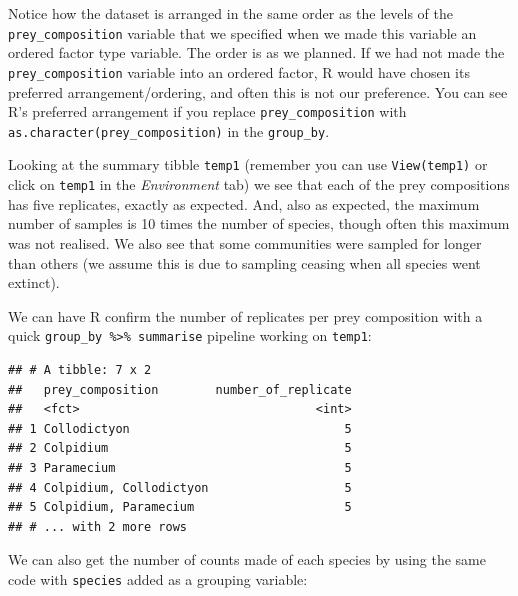 \documentclass[]{book}
\makeatletter
\newenvironment{Shaded}{\begin{snugshade}}{\end{snugshade}}
\newcommand{\DataTypeTok}[1]{\textcolor[rgb]{0.13,0.29,0.53}{#1}}
\newcommand{\KeywordTok}[1]{\textcolor[rgb]{0.13,0.29,0.53}{\textbf{#1}}}
\newcommand{\NormalTok}[1]{#1}
\newcommand{\OperatorTok}[1]{\textcolor[rgb]{0.81,0.36,0.00}{\textbf{#1}}}
\newcommand{\StringTok}[1]{\textcolor[rgb]{0.31,0.60,0.02}{#1}}
\newenvironment{kframe}{%
\medskip{}
\setlength{\fboxsep}{.8em}
 \def\at@end@of@kframe{}%
 \ifinner\ifhmode%
  \def\at@end@of@kframe{\end{minipage}}%
  \begin{minipage}{\columnwidth}%
 \fi\fi%
 \def\FrameCommand##1{\hskip\@totalleftmargin \hskip-\fboxsep
 \colorbox{shadecolor}{##1}\hskip-\fboxsep
     \hskip-\linewidth \hskip-\@totalleftmargin \hskip\columnwidth}%
 \MakeFramed {\advance\hsize-\width
   \@totalleftmargin\z@ \linewidth\hsize
   \@setminipage}}%
 {\par\unskip\endMakeFramed%
 \at@end@of@kframe}
\newenvironment{rmdblock}[1]
  {
  \begin{itemize}
  \renewcommand{\labelitemi}{
    \raisebox{-.7\height}[0pt][0pt]{
      {\setkeys{Gin}{width=3em,keepaspectratio}\texttt{[image: images/\#1]}}
    }
  }
  \setlength{\fboxsep}{1em}
  \begin{kframe}
  \item
  }
  {
  \end{kframe}
  \end{itemize}
  }
\newenvironment{info}
  {\begin{rmdblock}{info}}
  {\end{rmdblock}}
\makeatother
\begin{document}
\begin{info}
Notice how the dataset is arranged in the same order as the levels of
the \texttt{prey\_composition} variable that we specified when we made
this variable an ordered factor type variable. The order is as we
planned. If we had not made the \texttt{prey\_composition} variable into
an ordered factor, R would have chosen its preferred
arrangement/ordering, and often this is not our preference. You can see
R's preferred arrangement if you replace \texttt{prey\_composition} with
\texttt{as.character(prey\_composition)} in the \texttt{group\_by}.
\end{info}

Looking at the summary tibble \texttt{temp1} (remember you can use \texttt{View(temp1)} or click on \texttt{temp1} in the \emph{Environment} tab) we see that each of the prey compositions has five replicates, exactly as expected. And, also as expected, the maximum number of samples is 10 times the number of species, though often this maximum was not realised. We also see that some communities were sampled for longer than others (we assume this is due to sampling ceasing when all species went extinct).

We can have R confirm the number of replicates per prey composition with a quick \texttt{group\_by\ \%\textgreater{}\%\ summarise} pipeline working on \texttt{temp1}:

\begin{Shaded}
\end{Shaded}

\begin{verbatim}
## # A tibble: 7 x 2
##   prey_composition        number_of_replicate
##   <fct>                                 <int>
## 1 Collodictyon                              5
## 2 Colpidium                                 5
## 3 Paramecium                                5
## 4 Colpidium, Collodictyon                   5
## 5 Colpidium, Paramecium                     5
## # ... with 2 more rows
\end{verbatim}

We can also get the number of counts made of each species by using the same code with \texttt{species} added as a grouping variable:
\end{document}
